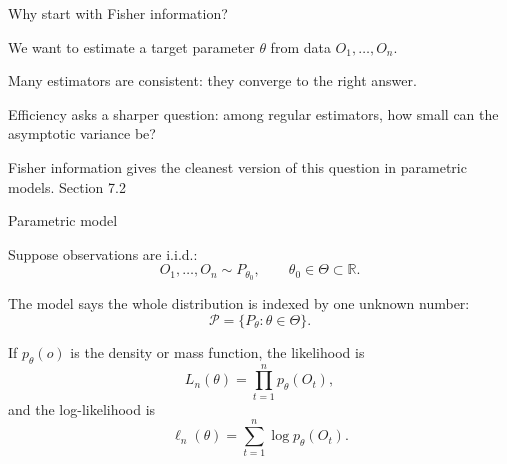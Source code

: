 \documentclass[xcolor={table}, handout]{beamer}
\begin{document}
\note{
\scriptsize \singlespacing

}
\begin{frame}{Why start with Fisher information?}

\begin{wideitemize}
\item We want to estimate a target parameter $\theta$ from data $O_1,\dots,O_n$.\pause
\item Many estimators are consistent: they converge to the right answer.\pause
\item Efficiency asks a sharper question:
among regular estimators,
how small can the asymptotic variance be?
\pause
\item Fisher information gives the cleanest version of this question in parametric models. \hfill \cite{lehmann1999elements} Section 7.2
\end{wideitemize}

\end{frame}

\note{
\scriptsize \singlespacing

}
\begin{frame}{Parametric model}

\begin{wideitemize}
\item Suppose observations are i.i.d.:
\[
O_1,\dots,O_n \sim P_{\theta_0}, \qquad \theta_0 \in \Theta \subset \mathbb{R}.
\]\pause
\item The model says the whole distribution is indexed by one unknown number:
\[
\mathcal{P} = \{P_\theta: \theta \in \Theta\}.
\]\pause
\item If $p_\theta(o)$ is the density or mass function, the likelihood is
\[
L_n(\theta)=\prod_{t=1}^n p_\theta(O_t),
\]
and the log-likelihood is
\[
\ell_n(\theta)=\sum_{t=1}^n \log p_\theta(O_t).
\]
\end{wideitemize}

\end{frame}
\end{document}
